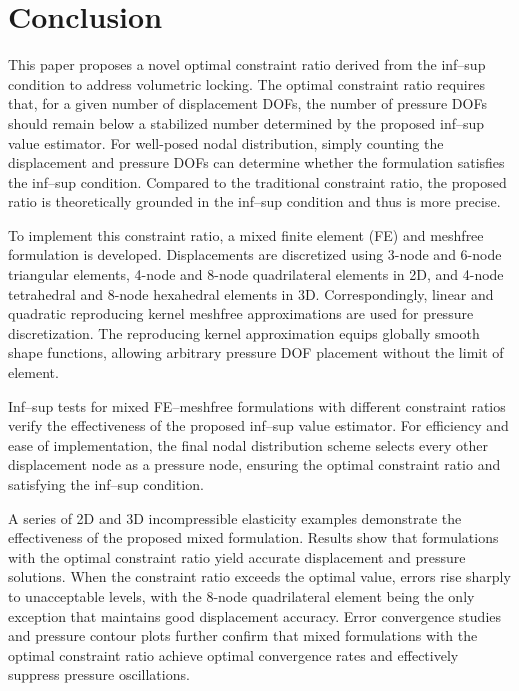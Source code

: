 \section{Conclusion}

This paper proposes a novel optimal constraint ratio derived from the inf--sup condition to address volumetric locking. The optimal constraint ratio requires that, for a given number of displacement DOFs, the number of pressure DOFs should remain below a stabilized number determined by the proposed inf--sup value estimator. For well-posed nodal distribution, simply counting the displacement and pressure DOFs can determine whether the formulation satisfies the inf--sup condition. Compared to the traditional constraint ratio, the proposed ratio is theoretically grounded in the inf--sup condition and thus is more precise.

To implement this constraint ratio, a mixed finite element (FE) and meshfree formulation is developed. Displacements are discretized using 3-node and 6-node triangular elements, 4-node and 8-node quadrilateral elements in 2D, and 4-node tetrahedral and 8-node hexahedral elements in 3D. Correspondingly, linear and quadratic reproducing kernel meshfree approximations are used for pressure discretization. The reproducing kernel approximation equips globally smooth shape functions, allowing arbitrary pressure DOF placement without the limit of element.

Inf--sup tests for mixed FE--meshfree formulations with different constraint ratios verify the effectiveness of the proposed inf--sup value estimator. For efficiency and ease of implementation, the final nodal distribution scheme selects every other displacement node as a pressure node, ensuring the optimal constraint ratio and satisfying the inf--sup condition.

A series of 2D and 3D incompressible elasticity examples demonstrate the effectiveness of the proposed mixed formulation. Results show that formulations with the optimal constraint ratio yield accurate displacement and pressure solutions. When the constraint ratio exceeds the optimal value, errors rise sharply to unacceptable levels, with the 8-node quadrilateral element being the only exception that maintains good displacement accuracy. Error convergence studies and pressure contour plots further confirm that mixed formulations with the optimal constraint ratio achieve optimal convergence rates and effectively suppress pressure oscillations.
